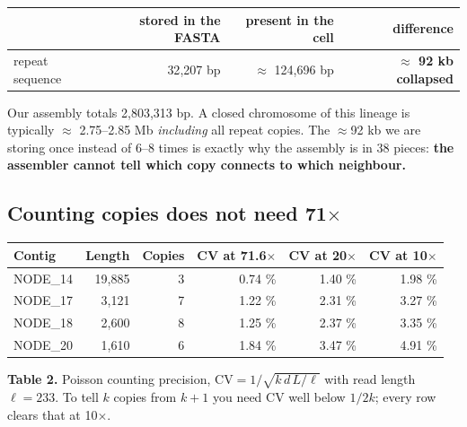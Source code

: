 \begin{labbox}[title={What is actually missing from our assembly}]
\begin{center}\small
\begin{tabular}{@{}l r r r@{}}
\toprule
\rowcolor{sand!20}
& \textbf{stored in the FASTA} & \textbf{present in the cell} & \textbf{difference}\\
\midrule
repeat sequence & 32{,}207 bp & $\approx$ 124{,}696 bp & \textbf{$\approx$ 92 kb collapsed}\\
\bottomrule
\end{tabular}
\end{center}
\vspace{3pt}
Our assembly totals 2{,}803{,}313 bp. A closed chromosome of this lineage is typically $\approx$ 2.75--2.85 Mb
\emph{including} all repeat copies. The $\approx$92 kb we are storing once instead of 6--8 times is
exactly why the assembly is in 38 pieces: \textbf{the assembler cannot tell which copy connects to
which neighbour.}
\end{labbox}

\subsection{Counting copies does not need 71$\times$}

\begin{center}\small
\begin{tabular}{@{}l r r r r r@{}}
\toprule
\rowcolor{sand!20}
\textbf{Contig} & \textbf{Length} & \textbf{Copies} & \textbf{CV at 71.6$\times$} & \textbf{CV at 20$\times$} & \textbf{CV at 10$\times$}\\
\midrule
NODE\_14 & 19{,}885 & 3 & 0.74 \% & 1.40 \% & 1.98 \%\\
NODE\_17 & 3{,}121 & 7 & 1.22 \% & 2.31 \% & 3.27 \%\\
NODE\_18 & 2{,}600 & 8 & 1.25 \% & 2.37 \% & 3.35 \%\\
NODE\_20 & 1{,}610 & 6 & 1.84 \% & 3.47 \% & 4.91 \%\\
\bottomrule
\end{tabular}
\end{center}
\vspace{-2pt}
\begin{center}\begin{minipage}{0.93\textwidth}\footnotesize\color{slate}
\textbf{Table 2.}\; Poisson counting precision, $\mathrm{CV}=1/\sqrt{k\,d\,L/\ell}$ with read length
$\ell=233$. To tell $k$ copies from $k+1$ you need CV well below $1/2k$; every row clears that at
10$\times$.
\end{minipage}\end{center}

